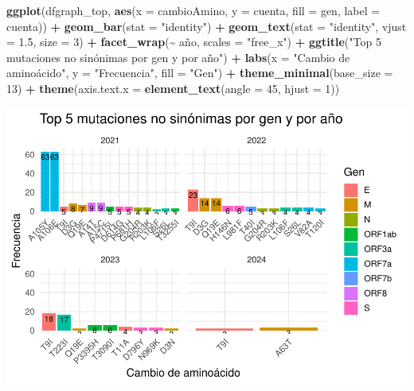 \documentclass[
]{article}
\newenvironment{Shaded}{\begin{snugshade}}{\end{snugshade}}
\newcommand{\AttributeTok}[1]{\textcolor[rgb]{0.13,0.29,0.53}{#1}}
\newcommand{\DecValTok}[1]{\textcolor[rgb]{0.00,0.00,0.81}{#1}}
\newcommand{\FloatTok}[1]{\textcolor[rgb]{0.00,0.00,0.81}{#1}}
\newcommand{\FunctionTok}[1]{\textcolor[rgb]{0.13,0.29,0.53}{\textbf{#1}}}
\newcommand{\NormalTok}[1]{#1}
\newcommand{\SpecialCharTok}[1]{\textcolor[rgb]{0.81,0.36,0.00}{\textbf{#1}}}
\newcommand{\StringTok}[1]{\textcolor[rgb]{0.31,0.60,0.02}{#1}}
\begin{document}
\begin{Shaded}
\begin{Highlighting}[]
\FunctionTok{ggplot}\NormalTok{(dfgraph\_top, }\FunctionTok{aes}\NormalTok{(}\AttributeTok{x =}\NormalTok{ cambioAmino, }\AttributeTok{y =}\NormalTok{ cuenta, }\AttributeTok{fill =}\NormalTok{ gen, }\AttributeTok{label =}\NormalTok{ cuenta)) }\SpecialCharTok{+}
  \FunctionTok{geom\_bar}\NormalTok{(}\AttributeTok{stat =} \StringTok{"identity"}\NormalTok{) }\SpecialCharTok{+}
  \FunctionTok{geom\_text}\NormalTok{(}\AttributeTok{stat =} \StringTok{"identity"}\NormalTok{, }\AttributeTok{vjust =} \FloatTok{1.5}\NormalTok{, }\AttributeTok{size =} \DecValTok{3}\NormalTok{) }\SpecialCharTok{+}
  \FunctionTok{facet\_wrap}\NormalTok{(}\SpecialCharTok{\textasciitilde{}}\NormalTok{ año, }\AttributeTok{scales =} \StringTok{"free\_x"}\NormalTok{) }\SpecialCharTok{+}
  \FunctionTok{ggtitle}\NormalTok{(}\StringTok{"Top 5 mutaciones no sinónimas por gen y por año"}\NormalTok{) }\SpecialCharTok{+}
  \FunctionTok{labs}\NormalTok{(}\AttributeTok{x =} \StringTok{"Cambio de aminoácido"}\NormalTok{, }\AttributeTok{y =} \StringTok{"Frecuencia"}\NormalTok{, }\AttributeTok{fill =} \StringTok{"Gen"}\NormalTok{) }\SpecialCharTok{+}
  \FunctionTok{theme\_minimal}\NormalTok{(}\AttributeTok{base\_size =} \DecValTok{13}\NormalTok{) }\SpecialCharTok{+}
  \FunctionTok{theme}\NormalTok{(}\AttributeTok{axis.text.x =} \FunctionTok{element\_text}\NormalTok{(}\AttributeTok{angle =} \DecValTok{45}\NormalTok{, }\AttributeTok{hjust =} \DecValTok{1}\NormalTok{))}
\end{Highlighting}
\end{Shaded}

\includegraphics{situacion_problema_files/figure-latex/unnamed-chunk-2-1.pdf}
\end{document}
